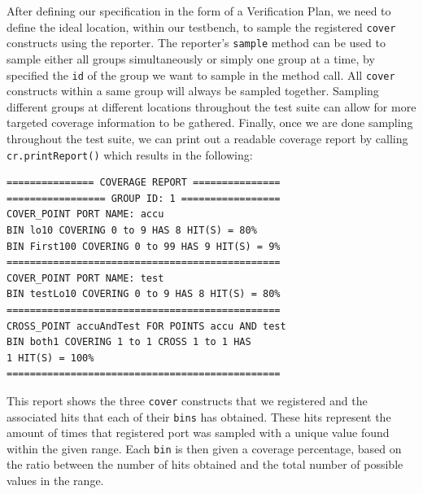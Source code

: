 \documentclass[conference]{IEEEtran}
\begin{document}
After defining our specification in the form of a Verification Plan, we need to define the ideal location, within our testbench, to sample the registered \texttt{cover} constructs using the reporter.
The reporter's \texttt{sample} method can be used to sample either all groups simultaneously or simply one group at a time, by specified the \texttt{id} of the group we want to sample in the method call.
All \texttt{cover} constructs within a same group will always be sampled together.
Sampling different groups at different locations throughout the test suite can allow for more targeted coverage information to be gathered.
Finally, once we are done sampling throughout the test suite, we can print out a readable coverage report by calling \texttt{cr.printReport()} which results in the following: 

\begin{verbatim}
=============== COVERAGE REPORT ===============
================= GROUP ID: 1 =================
COVER_POINT PORT NAME: accu
BIN lo10 COVERING 0 to 9 HAS 8 HIT(S) = 80%
BIN First100 COVERING 0 to 99 HAS 9 HIT(S) = 9%
===============================================
COVER_POINT PORT NAME: test
BIN testLo10 COVERING 0 to 9 HAS 8 HIT(S) = 80%
===============================================
CROSS_POINT accuAndTest FOR POINTS accu AND test
BIN both1 COVERING 1 to 1 CROSS 1 to 1 HAS
1 HIT(S) = 100%
===============================================
\end{verbatim}

This report shows the three \texttt{cover} constructs that we registered and the associated hits that each of their \texttt{bins} has obtained.
These hits represent the amount of times that registered port was sampled with a unique value found within the given range.
Each \texttt{bin} is then given a coverage percentage, based on the ratio between the number of hits obtained and the total number of possible values in the range.
\end{document}
